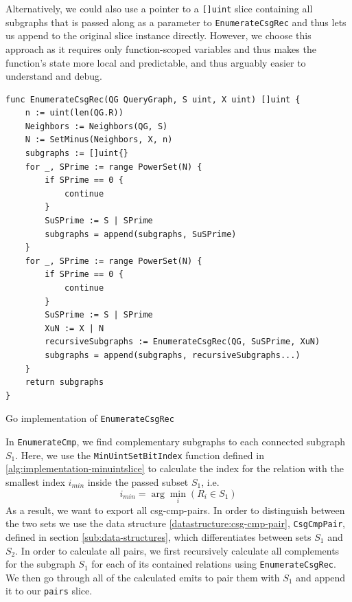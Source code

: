 \begin{note}
Alternatively, we could also use a pointer to a \texttt{[]uint} slice containing all subgraphs that is passed along as a parameter to \texttt{EnumerateCsgRec} and thus lets us append to the original slice instance directly. However, we choose this approach as it requires only function-scoped variables and thus makes the function's state more local and predictable, and thus arguably easier to understand and debug.
\end{note}

\vspace{0.4cm}
\begin{algorithm}[H]
\begin{verbatim}
func EnumerateCsgRec(QG QueryGraph, S uint, X uint) []uint {
    n := uint(len(QG.R))
    Neighbors := Neighbors(QG, S)
    N := SetMinus(Neighbors, X, n)
    subgraphs := []uint{}
    for _, SPrime := range PowerSet(N) {
        if SPrime == 0 {
            continue
        }
        SuSPrime := S | SPrime
        subgraphs = append(subgraphs, SuSPrime)
    }
    for _, SPrime := range PowerSet(N) {
        if SPrime == 0 {
            continue
        }
        SuSPrime := S | SPrime
        XuN := X | N
        recursiveSubgraphs := EnumerateCsgRec(QG, SuSPrime, XuN)
        subgraphs = append(subgraphs, recursiveSubgraphs...)
    }
    return subgraphs
}
\end{verbatim}
\caption{Go implementation of \texttt{EnumerateCsgRec}}
\label{alg:enumeratecsgrec}
\end{algorithm}

In \texttt{EnumerateCmp}, we find complementary subgraphs to each connected subgraph $S_1$.
Here, we use the \texttt{MinUintSetBitIndex} function defined in \ref{alg:implementation-minuintslice} to calculate the index for the relation with the smallest index $i_{min}$ inside the passed subset $S_1$, i.e.
\begin{equation}
i_{min} = \arg\min_i(R_i \in S_1)
\end{equation}
As a result, we want to export all csg-cmp-pairs. In order to distinguish between the two sets we use the data structure \ref{datastructure:csg-cmp-pair}, \texttt{CsgCmpPair}, defined in section \ref{sub:data-structures}, which differentiates between sets $S_1$ and $S_2$. In order to calculate all pairs, we first recursively calculate all complements for the subgraph $S_1$ for each of its contained relations using \texttt{EnumerateCsgRec}. We then go through all of the calculated emits to pair them with $S_1$ and append it to our \texttt{pairs} slice.

